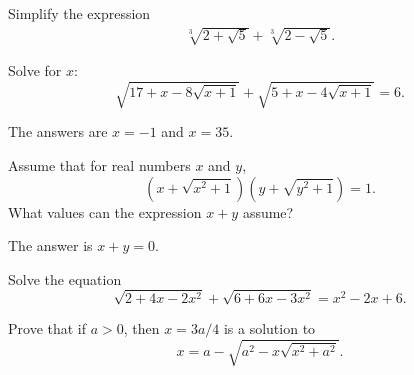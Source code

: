 \begin{question}[name={2009 Ecuador TST}]
    Simplify the expression
    \begin{align*}
        \sqrt[3]{2+\sqrt{5}}+\sqrt[3]{2-\sqrt{5}}.
    \end{align*}
\end{question}



\begin{question}[name={2008 Finland}]
    Solve for $x$:
    \[\sqrt{17+x-8\sqrt{x+1}} + \sqrt{5+x-4\sqrt{x+1}} = 6.\]
\end{question}


\begin{solution}
    The answers are $x=-1$ and $x=35$.
\end{solution}




\begin{question}[name={2014 Finland}]
    Assume that for real numbers $x$ and $y$,
    \[(x+\sqrt{x^2+1})(y+\sqrt{y^2+1}) = 1.\]
    What values can the expression $x + y$ assume?
\end{question}

\begin{solution}
    The answer is $x+y=0$.
\end{solution}


\begin{question}[name={2016 Finland}]
    Solve the equation
    \[\sqrt{2+4x-2x^2} + \sqrt{6+6x-3x^2} = x^2-2x+6.\]
\end{question}


\begin{question}[name={2017 Finland}]
    Prove that if $a>0$, then $x=3a/4$ is a solution to \[x = a - \sqrt{a^2-x\sqrt{x^2+a^2}}.\]
\end{question}



